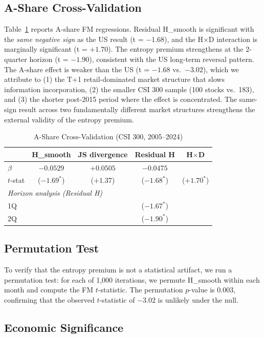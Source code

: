 \documentclass[12pt,a4paper]{article}
\begin{document}
\subsection{A-Share Cross-Validation}

Table~\ref{tab:ashare} reports A-share FM regressions. Residual H\_smooth is significant with the \textit{same negative sign} as the US result (t = $-1.68$), and the H$\times$D interaction is marginally significant (t = $+1.70$). The entropy premium strengthens at the 2-quarter horizon (t = $-1.90$), consistent with the US long-term reversal pattern. The A-share effect is weaker than the US (t = $-1.68$ vs.\ $-3.02$), which we attribute to (1) the T+1 retail-dominated market structure that slows information incorporation, (2) the smaller CSI 300 sample (100 stocks vs.\ 183), and (3) the shorter post-2015 period where the effect is concentrated. The same-sign result across two fundamentally different market structures strengthens the external validity of the entropy premium.

\begin{table}[H]
\centering
\caption{A-Share Cross-Validation (CSI 300, 2005--2024)}
\label{tab:ashare}
\small
\begin{tabular}{lcccc}
\toprule
 & H\_smooth & JS divergence & Residual H & H$\times$D \\
\midrule
$\beta$ & $-0.0529$ & $+0.0505$ & $-0.0475$ & \\
$t$-stat & ($-1.69^{*}$) & ($+1.37$) & ($-1.68^{*}$) & ($+1.70^{*}$) \\
\midrule
\multicolumn{5}{l}{\textit{Horizon analysis (Residual H)}} \\
1Q & & & ($-1.67^{*}$) & \\
2Q & & & ($-1.90^{*}$) & \\
\bottomrule
\end{tabular}
\end{table}

\subsection{Permutation Test}

To verify that the entropy premium is not a statistical artifact, we run a permutation test: for each of 1,000 iterations, we permute H\_smooth within each month and compute the FM $t$-statistic. The permutation $p$-value is 0.003, confirming that the observed $t$-statistic of $-3.02$ is unlikely under the null.

\subsection{Economic Significance}
\end{document}
